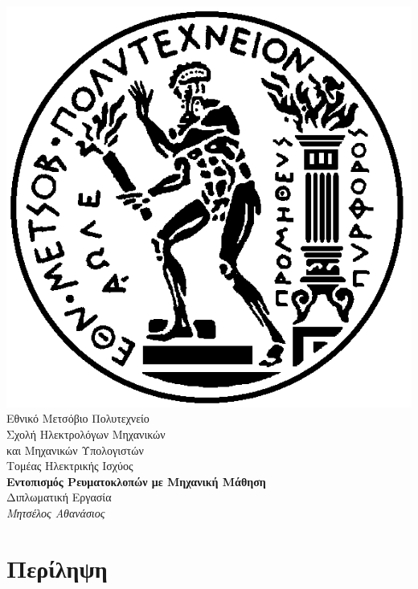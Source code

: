 \documentclass[11pt, a4paper, english, greek, twoside]{report}
\begin{document}
\begin{titlepage}
	\begin{center}
		\includegraphics[scale=0.2]{pyrforos.png}\\
		\Large{Εθνικό Μετσόβιο Πολυτεχνείο}\\
		\large{Σχολή Ηλεκτρολόγων Μηχανικών\\ και Μηχανικών Υπολογιστών}\\
		\large{Τομέας Ηλεκτρικής Ισχύος}\\	
      	\Large\textbf{Εντοπισμός Ρευματοκλοπών με Μηχανική Μάθηση}\\      	
      	\large{Διπλωματική Εργασία}\\
      	\large\textit{Μητσέλος Αθανάσιος}
   	\end{center}
\end{titlepage}

\chapter*{Περίληψη}
\end{document}
